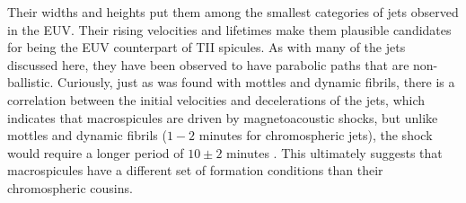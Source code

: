 \documentclass[12pt]{ociamthesis}
\begin{document}
%
Their widths and heights put them among the smallest categories of jets observed in the EUV. Their rising velocities and lifetimes make them plausible candidates for being the EUV counterpart of TII spicules. As with many of the jets discussed here, they have been observed to have parabolic paths that are non-ballistic. Curiously, just as was found with mottles and dynamic fibrils, there is a correlation between the initial velocities and decelerations of the jets, which indicates that macrospicules are driven by magnetoacoustic shocks, but unlike mottles and dynamic fibrils ($1-2$ minutes for chromospheric jets), the shock would require a longer period of $10\pm 2$ minutes \citep{Loboda2019ApJ871230L}. This ultimately suggests that macrospicules have a different set of formation conditions than their chromospheric cousins.
\end{document}
